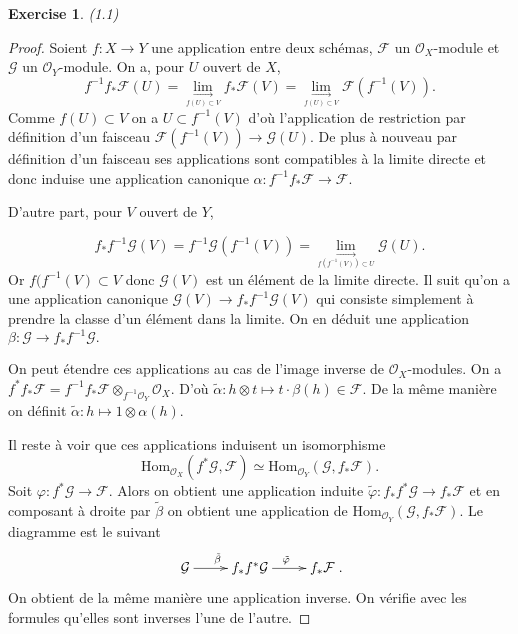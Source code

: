 \documentclass[A4, 11pt]{article}
\newtheorem{exer}{Exercise}
\begin{document}
\begin{exer}(1.1)
\end{exer}
\begin{proof}
Soient $f\colon X\rightarrow Y$ une application entre deux schémas, $\mathcal{F}$ un $\mathcal{O}_X$-module et $\mathcal{G}$ un $\mathcal{O}_Y$-module. On a, pour $U$ ouvert de $X$, 
$$f^{-1}f_* \mathcal{F}(U)=\lim\limits_{\underset{f(U)\subset V}{\rightarrow}} f_*\mathcal{F}(V)=\lim\limits_{\underset{f(U)\subset V}{\rightarrow}} \mathcal{F}(f^{-1}(V)).$$
Comme $f(U)\subset V$ on a $U\subset f^{-1}(V)$ d'où l'application de restriction par définition d'un faisceau $\mathcal{F}(f^{-1}(V))\rightarrow \mathcal{G}(U)$. De plus à nouveau par définition d'un faisceau ses applications sont compatibles à la limite directe et donc induise une application canonique $\alpha\colon f^{-1}f_* \mathcal{F} \rightarrow \mathcal{F}$.


D'autre part, pour $V$ ouvert de $Y$,


$$f_*f^{-1} \mathcal{G}(V)=f^{-1}\mathcal{G}(f^{-1}(V))=\lim\limits_{\underset{f(f^{-1}(V))\subset U}{\rightarrow}}\mathcal{G}(U).$$
Or $f(f^{-1}(V)\subset V$ donc $\mathcal{G}(V)$ est un élément de la limite directe. Il suit qu'on a une application canonique $\mathcal{G}(V)\rightarrow f_*f^{-1} \mathcal{G}(V)$ qui consiste simplement à prendre la classe d'un élément dans la limite. On en déduit une application $\beta\colon \mathcal{G}\rightarrow f_*f^{-1} \mathcal{G}.$

On peut étendre ces applications au cas de l'image inverse de $\mathcal{O}_X$-modules. 
On a $f^*f_* \mathcal{F}=f^{-1}f_*\mathcal{F}\otimes_{f^{-1}\mathcal{O}_Y} \mathcal{O}_X$. D'où $\tilde{\alpha} \colon h\otimes t \mapsto t\cdot\beta(h) \in \mathcal{F}$. De la même manière on définit $\tilde{\alpha} \colon h \mapsto 1\otimes \alpha(h)$. 

Il reste à voir que ces applications induisent un isomorphisme 
$$\mathrm{Hom}_{\mathcal{O}_X}(f^*\mathcal{G}, \mathcal{F})\simeq \mathrm{Hom}_{\mathcal{O}_Y} (\mathcal{G},f_* \mathcal{F}).$$
Soit $\varphi\colon f^* \mathcal{G}\rightarrow \mathcal{F}$. Alors on obtient une application induite $\tilde{\varphi} \colon f_*f^*\mathcal{G}\rightarrow f_*\mathcal{F}$ et en composant à droite par $\tilde{\beta}$ on obtient une application de $\mathrm{Hom}_{\mathcal{O}_Y} (\mathcal{G},f_* \mathcal{F})$. Le diagramme est le suivant
$$\xymatrix{
\mathcal{G} \ar[r]^{\tilde{\beta}} & f_*f^* \mathcal{G} \ar[r]^{\tilde{\varphi}} & f_* \mathcal{F}
}.$$
On obtient de la même manière une application inverse. On vérifie avec les formules qu'elles sont inverses l'une de l'autre.
\end{proof}
\end{document}
